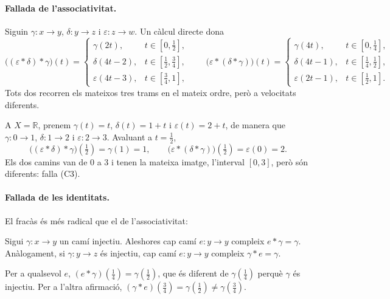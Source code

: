 \paragraph{Fallada de l'associativitat.} Siguin $\gamma\colon x\to y$, $\delta\colon y\to z$ i $\varepsilon\colon z\to w$. Un càlcul directe dona
\[
\bigl((\varepsilon\ast\delta)\ast\gamma\bigr)(t)=
\begin{cases}
\gamma(2t), & t\in[0,\frac12],\\
\delta(4t-2), & t\in[\frac12,\frac34],\\
\varepsilon(4t-3), & t\in[\frac34,1],
\end{cases}
\qquad
\bigl(\varepsilon\ast(\delta\ast\gamma)\bigr)(t)=
\begin{cases}
\gamma(4t), & t\in[0,\frac14],\\
\delta(4t-1), & t\in[\frac14,\frac12],\\
\varepsilon(2t-1), & t\in[\frac12,1].
\end{cases}
\]
Tots dos recorren els mateixos tres trams en el mateix ordre, però a velocitats diferents.

\begin{exemple}\label{ex:camins-recta}
A $X=\mathbb R$, prenem $\gamma(t)=t$, $\delta(t)=1+t$ i $\varepsilon(t)=2+t$, de manera que $\gamma\colon0\to1$, $\delta\colon1\to2$ i $\varepsilon\colon2\to3$. Avaluant a $t=\frac12$,
\[
\bigl((\varepsilon\ast\delta)\ast\gamma\bigr)(\tfrac12)=\gamma(1)=1,
\qquad
\bigl(\varepsilon\ast(\delta\ast\gamma)\bigr)(\tfrac12)=\varepsilon(0)=2.
\]
Els dos camins van de $0$ a $3$ i tenen la mateixa imatge, l'interval $[0,3]$, però són diferents: falla (C3).
\end{exemple}

\paragraph{Fallada de les identitats.} El fracàs és més radical que el de l'associativitat:

\begin{proposicio}\label{prop:camins-sense-identitat}
Sigui $\gamma\colon x\to y$ un camí injectiu. Aleshores cap camí $e\colon y\to y$ compleix $e\ast\gamma=\gamma$. Anàlogament, si $\gamma\colon y\to z$ és injectiu, cap camí $e\colon y\to y$ compleix $\gamma\ast e=\gamma$.
\end{proposicio}

\begin{prova}
Per a qualsevol $e$, $(e\ast\gamma)(\frac14)=\gamma(\frac12)$, que és diferent de $\gamma(\frac14)$ perquè $\gamma$ és injectiu. Per a l'altra afirmació, $(\gamma\ast e)(\frac34)=\gamma(\frac12)\neq\gamma(\frac34)$.
\end{prova}

